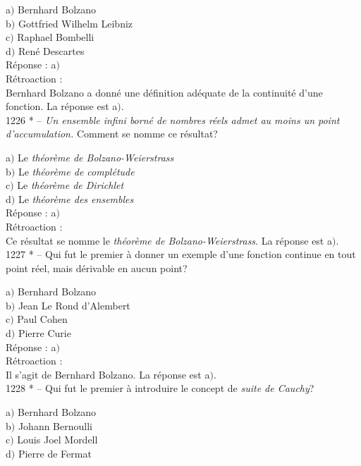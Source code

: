 ﻿\documentclass[letterpaper, 12pt]{article}
\begin{document}
a$)$ Bernhard Bolzano \\
b$)$ Gottfried Wilhelm Leibniz \\
c$)$ Raphael Bombelli \\
d$)$ Ren\'e Descartes\\

R\'eponse : a$)$\\

R\'etroaction : \\
Bernhard Bolzano a donn\'e une d\'efinition ad\'equate de la
continuit\'e d'une fonction.
La r\'eponse est a$)$.\\

1226 * -- {\sl Un ensemble infini born\'e de nombres r\'eels admet
au moins un point d'accumulation.} Comment se nomme ce r\'esultat?

a$)$ Le {\sl th\'eor\`eme de Bolzano-Weierstrass} \\
b$)$ Le {\sl th\'eor\`eme de compl\'etude} \\
c$)$ Le {\sl th\'eor\`eme de Dirichlet} \\
d$)$ Le {\sl th\'eor\`eme des ensembles}\\

R\'eponse : a$)$\\

R\'etroaction : \\
Ce r\'esultat se nomme le {\sl th\'eor\`eme de Bolzano-Weierstrass}.
La r\'eponse est a$)$.\\

1227 * -- Qui fut le premier \`a donner un exemple d'une fonction
continue en tout point r\'eel, mais d\'erivable en aucun point?

a$)$ Bernhard Bolzano \\
b$)$ Jean Le Rond d'Alembert \\
c$)$ Paul Cohen \\
d$)$ Pierre Curie\\

R\'eponse : a$)$\\

R\'etroaction : \\
Il s'agit de Bernhard Bolzano.
La r\'eponse est a$)$.\\

1228 * -- Qui fut le premier \`a introduire le concept de {\sl suite
de Cauchy}?

a$)$ Bernhard Bolzano \\
b$)$ Johann Bernoulli \\
c$)$ Louis Joel Mordell \\
d$)$ Pierre de Fermat\\
\end{document}
